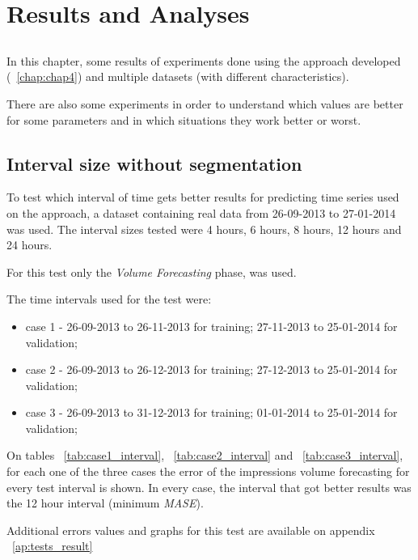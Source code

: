 \chapter{Results and Analyses} \label{chap:experiments}

\section*{}

In this chapter, some results of experiments done using the approach developed
(~\ref{chap:chap4}) and multiple datasets (with different characteristics).

There are also some experiments in order to understand which values are better
for some parameters and in which situations they work better or worst.

\section{Interval size without segmentation}

To test which interval of time gets better results for predicting time series
used on the approach, a dataset containing real data from 26-09-2013 to
27-01-2014 was used. The interval sizes tested were 4 hours, 6 hours, 8 hours,
12 hours and 24 hours.

For this test only the \emph{Volume Forecasting} phase, was used.

The time intervals used for the test were:
\begin{itemize}
\item case 1 - 26-09-2013 to 26-11-2013 for training;
27-11-2013 to 25-01-2014 for validation;
\item case 2 - 26-09-2013 to 26-12-2013 for training; 27-12-2013 to 25-01-2014
for validation;
\item case 3 - 26-09-2013 to 31-12-2013 for training; 01-01-2014 to 25-01-2014
for validation;
\end{itemize}

On tables ~\ref{tab:case1_interval}, ~\ref{tab:case2_interval} and
~\ref{tab:case3_interval}, for each one of the three cases the error of the
impressions volume forecasting for every test interval is shown.
In every case, the interval that got better results was the 12 hour interval
(minimum \emph{MASE}).

Additional errors values and graphs for this test are available on appendix
~\ref{ap:tests_result}


